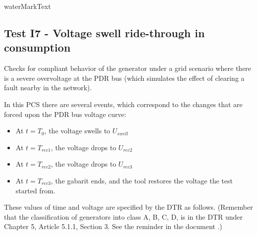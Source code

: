     {{ waterMarkText }}

    \renewcommand{\DTRPcs}{GridVoltageSwell} %
    \renewcommand{\PCSname}{PCS_RTE-I16z3}
    \renewcommand{\OCname}{QzeroConsumption}


    \subsection{Test I7 - Voltage swell ride-through in consumption}

    Checks for compliant behavior of the generator under a grid scenario where
    there is a severe overvoltage at the PDR bus (which simulates the
    effect of clearing a fault nearby in the network).

    \GridCircuitZthree

    In this PCS there are several events, which correspond to the changes that are
    forced upon the PDR bus voltage curve:
    \begin{itemize}
        \item At $t = T_{0}$, the voltage swells to $U_{swell}$
        \item At $t = T_{rec1}$, the voltage drops to $U_{rec2}$
        \item At $t = T_{rec2}$, the voltage drops to $U_{rec3}$
        \item At $t = T_{rec3}$, the gabarit ends, and the tool restores the
        voltage the test started from.
    \end{itemize}
    These values of time and voltage are specified by the DTR as follows. (Remember
    that the classification of generators into class A, B, C, D, is in the DTR under
    Chapter 5, Article 5.1.1, Section 3. See the reminder in the document
    .)

